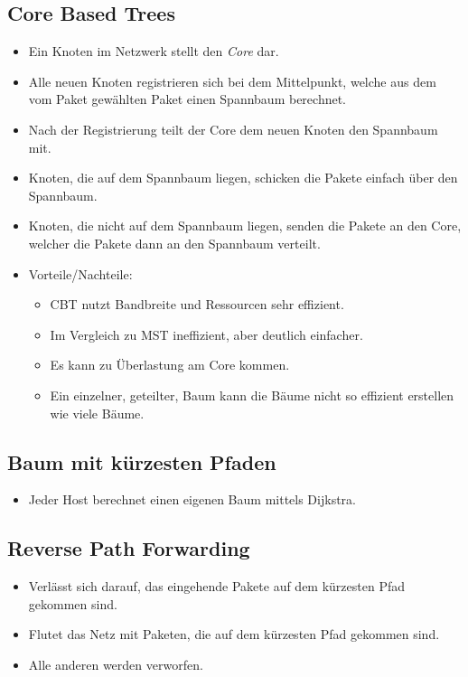         \subsection{Core Based Trees}
            \begin{itemize}
            	\item Ein Knoten im Netzwerk stellt den \textit{Core} dar.
            	\item Alle neuen Knoten registrieren sich bei dem Mittelpunkt, welche aus dem vom Paket gewählten Paket einen Spannbaum berechnet.
            	\item Nach der Registrierung teilt der Core dem neuen Knoten den Spannbaum mit.
            	\item Knoten, die auf dem Spannbaum liegen, schicken die Pakete einfach über den Spannbaum.
            	\item Knoten, die nicht auf dem Spannbaum liegen, senden die Pakete an den Core, welcher die Pakete dann an den Spannbaum verteilt.
            	\item Vorteile/Nachteile:
                	\begin{itemize}
                		\item CBT nutzt Bandbreite und Ressourcen sehr effizient.
                		\item Im Vergleich zu MST ineffizient, aber deutlich einfacher.
                		\item Es kann zu Überlastung am Core kommen.
                		\item Ein einzelner, geteilter, Baum kann die Bäume nicht so effizient erstellen wie viele Bäume.
                	\end{itemize}
            \end{itemize}

        \subsection{Baum mit kürzesten Pfaden}
            \begin{itemize}
            	\item Jeder Host berechnet einen eigenen Baum mittels Dijkstra.
            \end{itemize}

        \subsection{Reverse Path Forwarding}
            \begin{itemize}
            	\item Verlässt sich darauf, das eingehende Pakete auf dem kürzesten Pfad gekommen sind.
            	\item Flutet das Netz mit Paketen, die auf dem kürzesten Pfad gekommen sind.
            	\item Alle anderen werden verworfen.
            \end{itemize}

